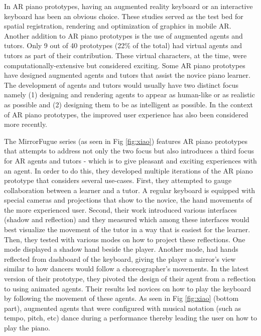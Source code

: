 \documentclass[sigchi, review]{acmart}
\begin{document}
In AR piano prototypes, having an augmented reality keyboard or an interactive keyboard has been an obvious choice. These studies served as the test bed for spatial registration, rendering and optimization of graphics in mobile AR. Another addition to AR piano prototypes is the use of augmented agents and tutors. Only 9 out of 40 prototypes (22\% of the total) had virtual agents and tutors as part of their contribution. These virtual characters, at the time, were computationally-extensive but considered exciting. Some AR piano prototypes have designed augmented agents and tutors that assist the novice piano learner. The development of agents and tutors would usually have two distinct focus namely (1) designing and rendering agents to appear as human-like or as realistic as possible and (2) designing them to be as intelligent as possible. In the context of AR piano prototypes, the improved user experience has also been considered more recently. 

The MirrorFugue series \cite{xiao2010mirrorfugue, xiao2011duet, xiao2013mirrorfugue, xiao2014andante} (as seen in Fig \ref{fig:xiao}) features AR piano prototypes that attempts to address not only the two focus but also introduces a third focus for AR agents and tutors - which is to give pleasant and exciting experiences with an agent. In order to do this, they developed multiple iterations of the AR piano prototype that considers several use-cases. First, they attempted to gauge collaboration between a learner and a tutor. A regular keyboard is equipped with special cameras and projections that show to the novice, the hand movements of the more experienced user. Second, their work introduced various interfaces (shadow and reflection) and they measured which among these interfaces would best visualize the movement of the tutor in a way that is easiest for the learner. Then, they tested with various modes on how to project these reflections. One mode displayed a shadow hand beside the player. Another mode, had hands reflected from dashboard of the keyboard, giving the player a mirror's view similar to how dancers would follow a choreographer's movements. In the latest version of their prototype, they pivoted the design of their agent from a reflection to using animated agents. Their results led novices on how to play the keyboard by following the movement of these agents. As seen in Fig \ref{fig:xiao} (bottom part), augmented agents that were configured with musical notation (such as tempo, pitch, etc) dance during a performance thereby leading the user on how to play the piano. 
\end{document}
